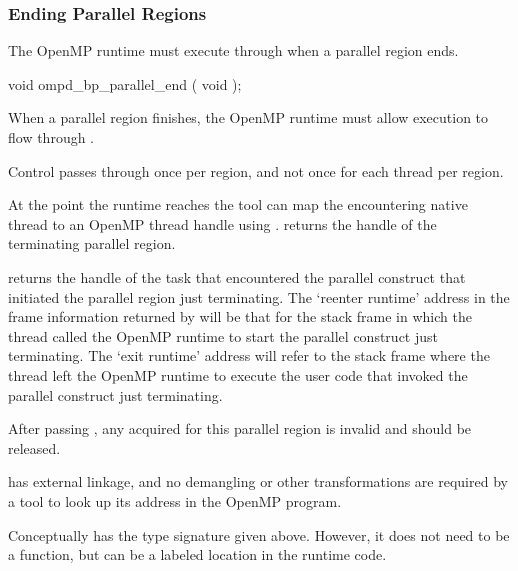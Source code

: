 \subsubsection{Ending Parallel Regions}
\label{subsubsec:ompd_bp_parallel_end}

The OpenMP runtime must execute through 
when a parallel region ends.


\begin{cspecific}
\begin{ompSyntax}
void ompd_bp_parallel_end ( void );
\end{ompSyntax}
\end{cspecific}


\descr

When a parallel region finishes, the OpenMP runtime must allow execution
to flow through .

Control passes through 
once per region, and not once for each thread per region.

At the point the runtime reaches 
the tool can map the encountering native thread
to an OpenMP thread handle using .
returns the handle of the terminating parallel region.

returns the handle of the task that encountered the
parallel construct that initiated the parallel region just
terminating.
The `reenter runtime' address in the frame information returned by
will be that for the stack frame in which the thread called the
OpenMP runtime to start the parallel construct just terminating.
The `exit runtime' address will refer to the stack frame where the
thread left the OpenMP runtime to execute the user code that
invoked the parallel construct just terminating.

After passing , any  acquired for this
parallel region is invalid and should be released.

\restrictions

 has external  linkage, and no
demangling or other transformations are required by a tool
to look up its address in the OpenMP program.

Conceptually  has the type signature
given above.
However, it does not need to be a function, but can be a labeled location
in the runtime code.

